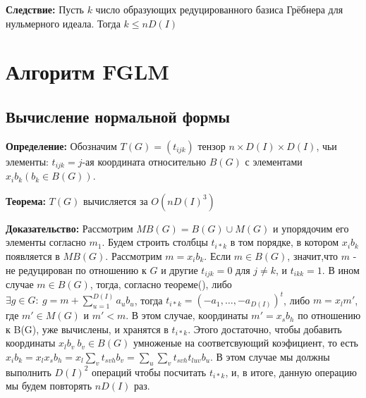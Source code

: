 \documentclass{article}
\begin{document}
    \textbf{Следствие:} Пусть $k$ число образующих редуцированного базиса Грёбнера для нульмерного идеала.
        Тогда $k \leq nD(I)$
    
    \newpage    

\section{Алгоритм FGLM}

    \subsection{Вычисление нормальной формы}
    \textbf{Определение:}  Обозначим $T(G) = (t_{ijk})$ тензор $n \times D(I) \times D(I)$, чьи элементы:
            $t_{ijk}=j$-ая координата относительно $B(G)$ с элементами $x_ib_k (b_k \in B(G))$.

    \textbf{Теорема:} $T(G)$ вычисляется за $O(nD(I)^3)$

    \textbf{Доказательство:} Рассмотрим $MB(G) = B(G) \cup M(G)$ и упорядочим его элементы согласно $m_1$. Будем строить столбцы
    $t_{i*k}$ в том порядке, в котором $x_ib_k$ появляется в $MB(G)$. Рассмотрим $m=x_ib_k$. Если $m \in B(G)$, значит,что $m$ - не 
    редуцирован по отношению к $G$ и другие $t_{ijk} = 0$ для $j \neq k$, и $t_{ikk}=1$. В ином случае $m \in B(G)$, тогда, согласно теореме(), 
    либо $\exists g \in G:\: g=m+\sum_{u=1}^{D(I)} a_ub_u$, тогда $t_{i*k}=(-a_1,\ldots, -a_{D(I)})^t$, либо
    $m=x_lm'$, где $m'\in M(G)$ и $m'<m$. В этом случае, координаты $m'=x_sb_h$ по отношению к B(G), уже вычислены, и хранятся в $t_{i*k}$. 
    Этого достаточно, чтобы добавить координаты $x_lb_v \: b_v \in B(G)$ умноженые на соответсвующий коэфициент, то есть
    $x_ib_k = x_lx_sb_h = x_l\sum_{v} {t_{svh}b_v}=\sum_u\sum_v{t_{svh}t_{luv}b_u}$. В этом случае мы должны выполнить $D(I)^2$ операций
    чтобы посчитать $t_{i*k}$, и, в итоге, данную операцию мы будем повторять $nD(I)$ раз.
\end{document}
